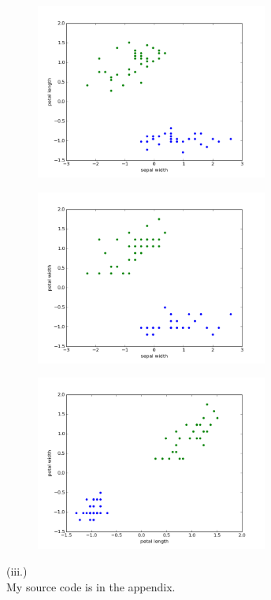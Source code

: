 \documentclass{article} %
\begin{document}
\begin{figure}[htbp] %
   \centering
   \includegraphics[width=3in]{img/figure4.png} 
\end{figure}

\begin{figure}[htbp] %
   \centering
   \includegraphics[width=3in]{img/figure5.png} 
\end{figure}

\begin{figure}[htbp] %
   \centering
   \includegraphics[width=3in]{img/figure6.png} 
\end{figure}

(iii.) \\
My source code is in the appendix.
\end{document}
